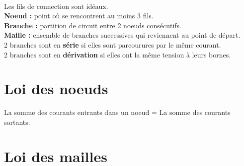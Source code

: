 \documentclass[12pt,twoside,a4paper]{article}
\author{MPSI 2}
\begin{document}
	\maketitle\ \\
	Les fils de connection sont id\'eaux. \\
	\textbf{Noeud :} point o\`u se rencontrent au moins 3 fils. \\
	\textbf{Branche :} partition de circuit entre 2 noeuds cons\'ecutifs. \\
	\textbf{Maille :} ensemble de branches successives qui reviennent au point de d\'epart. \\
	2 branches sont en \textbf{s\'erie} si elles sont parcourures par le m\^eme courant. \\
	2 branches sont en \textbf{d\'erivation} si elles ont la m\^eme tension \`a leurs bornes. \\
	\section{Loi des noeuds}
		La somme des courants entrants dans un noeud = La somme des courants sortants.
	\section{Loi des mailles}
		\begin{center}
		\end{center}
\end{document}
